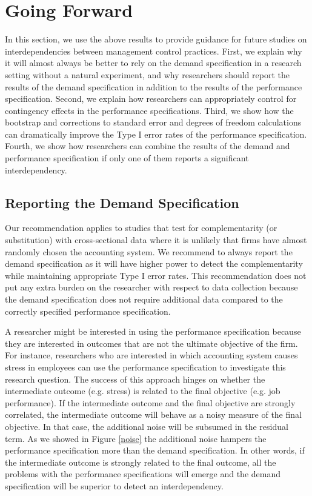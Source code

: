 \documentclass[12pt]{article}
\begin{document}
\section{Going Forward}

In this section, we use the above results to provide guidance for future studies on interdependencies between management control practices. First, we explain why it will almost always be better to rely on the demand specification in a research setting without a natural experiment, and why researchers should report the results of the demand specification in addition to the results of the performance specification. Second, we explain how researchers can appropriately control for contingency effects in the performance specifications. Third, we show how the bootstrap and corrections to standard error and degrees of freedom calculations can dramatically improve the Type I error rates of the performance specification. Fourth, we show how researchers can combine the results of the demand and performance specification if only one of them reports a significant interdependency.

\subsection{Reporting the Demand Specification}

Our recommendation applies to studies that test for complementarity (or substitution) with cross-sectional data where it is unlikely that firms have almost randomly chosen the accounting system. We recommend to always report the demand specification as it will have higher power to detect the complementarity while maintaining appropriate Type I error rates. This recommendation does not put any extra burden on the researcher with respect to data collection because the demand specification does not require additional data compared to the correctly specified performance specification. 

A researcher might be interested in using the performance specification because they are interested in outcomes that are not the ultimate objective of the firm. For instance, researchers who are interested in which accounting system causes stress in employees \citep{shields_design_2000} can use the performance specification to investigate this research question. The success of this approach hinges on whether the intermediate outcome (e.g. stress) is related to the final objective (e.g. job performance). If the intermediate outcome and the final objective are strongly correlated, the intermediate outcome will behave as a noisy measure of the final objective. In that case, the additional noise will be subsumed in the residual term. As we showed in Figure \ref{noise} the additional noise hampers the performance specification more than the demand specification. In other words, if the intermediate outcome is strongly related to the final outcome, all the problems with the performance specifications will emerge and the demand specification will be superior to detect an interdependency.
\end{document}
